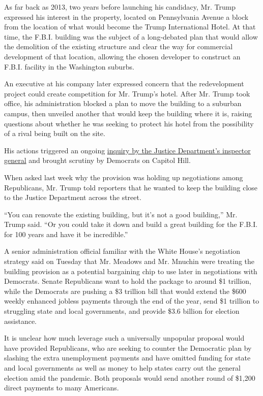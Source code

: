 As far back as 2013, two years before launching his candidacy, Mr. Trump
expressed his interest in the property, located on Pennsylvania Avenue a
block from the location of what would become the Trump International
Hotel. At that time, the F.B.I. building was the subject of a
long-debated plan that would allow the demolition of the existing
structure and clear the way for commercial development of that location,
allowing the chosen developer to construct an F.B.I. facility in the
Washington suburbs.

An executive at his company later expressed concern that the
redevelopment project could create competition for Mr. Trump's hotel.
After Mr. Trump took office, his administration blocked a plan to move
the building to a suburban campus, then unveiled another that would keep
the building where it is, raising questions about whether he was seeking
to protect his hotel from the possibility of a rival being built on the
site.

His actions triggered an ongoing
\href{https://www.nytimes.com/2019/07/03/us/politics/fbi-headquarters-inspector-general-investigation.html}{inquiry
by the Justice Department's inspector general} and brought scrutiny by
Democrats on Capitol Hill.

When asked last week why the provision was holding up negotiations among
Republicans, Mr. Trump told reporters that he wanted to keep the
building close to the Justice Department across the street.

``You can renovate the existing building, but it's not a good
building,'' Mr. Trump said. ``Or you could take it down and build a
great building for the F.B.I. for 100 years and have it be incredible.''

A senior administration official familiar with the White House's
negotiation strategy said on Tuesday that Mr. Meadows and Mr. Mnuchin
were treating the building provision as a potential bargaining chip to
use later in negotiations with Democrats. Senate Republicans want to
hold the package to around \$1 trillion, while the Democrats are pushing
a \$3 trillion bill that would extend the \$600 weekly enhanced jobless
payments through the end of the year, send \$1 trillion to struggling
state and local governments, and provide \$3.6 billion for election
assistance.

It is unclear how much leverage such a universally unpopular proposal
would have provided Republicans, who are seeking to counter the
Democratic plan by slashing the extra unemployment payments and have
omitted funding for state and local governments as well as money to help
states carry out the general election amid the pandemic. Both proposals
would send another round of \$1,200 direct payments to many Americans.

